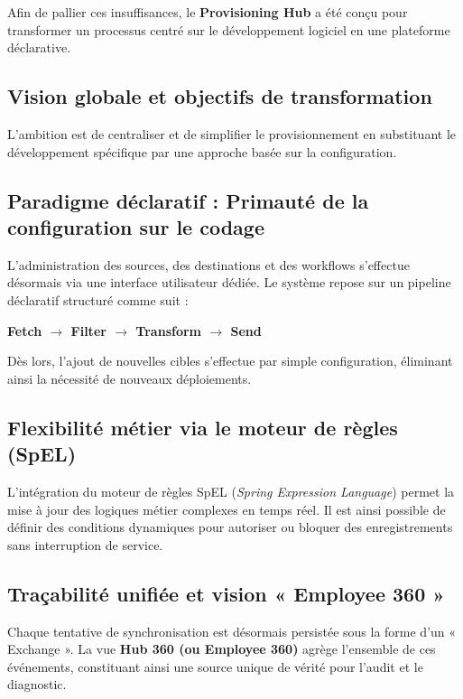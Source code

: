 Afin de pallier ces insuffisances, le \textbf{Provisioning Hub} a été conçu pour transformer un processus centré sur le développement logiciel en une plateforme déclarative.

\subsection{Vision globale et objectifs de transformation}
L'ambition est de centraliser et de simplifier le provisionnement en substituant le développement spécifique par une approche basée sur la configuration.

\subsection{Paradigme déclaratif : Primauté de la configuration sur le codage}
L'administration des sources, des destinations et des workflows s'effectue désormais via une interface utilisateur dédiée. Le système repose sur un pipeline déclaratif structuré comme suit : 
\begin{center}
    \textbf{Fetch $\rightarrow$ Filter $\rightarrow$ Transform $\rightarrow$ Send}
\end{center}
Dès lors, l'ajout de nouvelles cibles s'effectue par simple configuration, éliminant ainsi la nécessité de nouveaux déploiements.

\subsection{Flexibilité métier via le moteur de règles (SpEL)}
L'intégration du moteur de règles SpEL (\textit{Spring Expression Language}) permet la mise à jour des logiques métier complexes en temps réel. Il est ainsi possible de définir des conditions dynamiques pour autoriser ou bloquer des enregistrements sans interruption de service.

\subsection{Traçabilité unifiée et vision « Employee 360 »}
Chaque tentative de synchronisation est désormais persistée sous la forme d'un « Exchange ». La vue \textbf{Hub 360 (ou Employee 360)} agrège l'ensemble de ces événements, constituant ainsi une source unique de vérité pour l'audit et le diagnostic.

